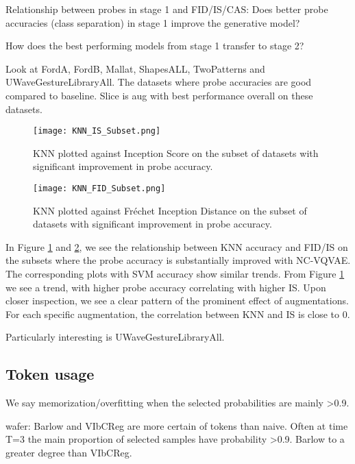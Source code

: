 \documentclass[../../thesis.tex]{subfiles}
\begin{document}
Relationship between probes in stage 1 and FID/IS/CAS:
Does better probe accuracies (class separation) in stage 1 improve the generative model?\newline

How does the best performing models from stage 1 transfer to stage 2?\newline

Look at FordA, FordB, Mallat, ShapesALL, TwoPatterns and UWaveGestureLibraryAll. The datasets where probe accuracies are good compared to baseline. Slice is aug with best performance overall on these datasets. \newline

\begin{figure}[h]
    \texttt{[image: KNN\_IS\_Subset.png]}
    \centering  
    \caption{KNN plotted against Inception Score on the subset of datasets with significant improvement in probe accuracy.}
    \label{fig:KNN_IS_Subset}
\end{figure}

\begin{figure}[H]
    \texttt{[image: KNN\_FID\_Subset.png]}
    \centering  
    \caption{KNN plotted against Fréchet Inception Distance on the subset of datasets with significant improvement in probe accuracy.}
    \label{fig:KNN_FID_Subset}
\end{figure}

In Figure \ref{fig:KNN_IS_Subset} and \ref{fig:KNN_FID_Subset}, we see the relationship between KNN accuracy and FID/IS on the subsets where the probe accuracy is substantially improved with NC-VQVAE. The corresponding plots with SVM accuracy show similar trends. From Figure \ref{fig:KNN_IS_Subset} we see a trend, with higher probe accuracy correlating with higher IS. Upon closer inspection, we see a clear pattern of the prominent effect of augmentations. 
For each specific augmentation, the correlation between KNN and IS is close to $0$.

Particularly interesting is UWaveGestureLibraryAll.




\subsection{Token usage}
We say memorization/overfitting when the selected probabilities are mainly >0.9. 


wafer: Barlow and VIbCReg are more certain of tokens than naive. Often at time T=3 the main proportion of selected samples have probability >0.9. Barlow to a greater degree than VIbCReg.
\end{document}
